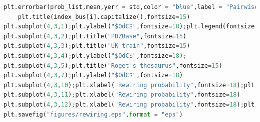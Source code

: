 \documentclass[12pt]{article}
\begin{document}
\begin{lstlisting}[breaklines=true,language=Python]
    plt.errorbar(prob_list,mean,yerr = std,color = "blue",label = "Pairwise rewiring")
    plt.title(index_bus[i].capitalize(),fontsize=15)
plt.subplot(4,3,1);plt.ylabel("$OdC$",fontsize=18);plt.legend(fontsize = 12);plt.title("Dolphins",fontsize=15)
plt.subplot(4,3,2);plt.title("PDZBase",fontsize=15)
plt.subplot(4,3,3);plt.title("UK train",fontsize=15)
plt.subplot(4,3,4);plt.ylabel("$OdC$",fontsize=18);
plt.subplot(4,3,5);plt.title("Roget's thesaurus",fontsize=15)
plt.subplot(4,3,7);plt.ylabel("$OdC$",fontsize=18)
plt.subplot(4,3,10);plt.xlabel("Rewiring probability",fontsize=18);plt.ylabel("$OdC$",fontsize=18)
plt.subplot(4,3,11);plt.xlabel("Rewiring probability",fontsize=18)
plt.subplot(4,3,12);plt.xlabel("Rewiring probability",fontsize=18);plt.legend(fontsize = 12)
plt.savefig("figures/rewiring.eps",format = "eps")
\end{lstlisting}
\end{document}
